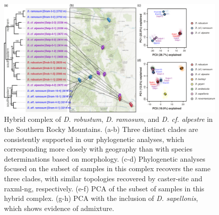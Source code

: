 \documentclass[11pt]{article}
\begin{document}
\begin{figure}[t!]
	\centering
	  \includegraphics[width=0.99\textwidth]{./figures/ramosum-robustum-alpestre3}	
	\caption{
        Hybrid complex of \emph{D. robustum}, \emph{D. ramosum}, and \emph{D. cf. alpestre} in the Southern Rocky Mountains. 
        (a-b) Three distinct clades are consistently supported in our phylogenetic analyses, which corresponding more closely with geography than with species determinations based on morphology.
        (c-d) Phylogenetic analyses focused on the subset of samples in this complex
        recovers the same three clades, with similar topologies recovered by caster-site and raxml-ng, respectively.
        (e-f) PCA of the subset of samples in this hybrid complex.
        (g-h) PCA with the inclusion of \emph{D. sapellonis}, which shows evidence of admixture.        
	}
	\label{fig:robustum}
\end{figure}
\end{document}
